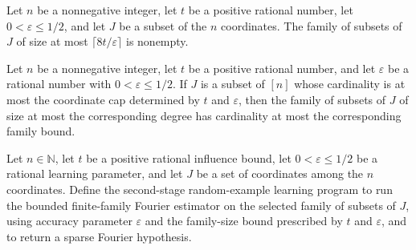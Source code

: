 \begin{theorem}
\label{FABL.monotoneSelectedFourierFamily_nonempty}
\leanok
{}
Let $n$ be a nonnegative integer, let $t$ be a positive rational number, let
$0<\varepsilon\le 1/2$, and let $J$ be a subset of the $n$ coordinates. The family of
subsets of $J$ of size at most $\lceil 8t/\varepsilon\rceil$ is nonempty.
\end{theorem}

\begin{theorem}
\label{FABL.card_monotoneSelectedFourierFamily_le}
\leanok
{}
Let $n$ be a nonnegative integer, let $t$ be a positive rational number, and let
$\varepsilon$ be a rational number with $0<\varepsilon\le 1/2$. If $J$ is a subset of
$[n]$ whose cardinality is at most the coordinate cap determined by $t$ and
$\varepsilon$, then the family of subsets of $J$ of size at most the corresponding
degree has cardinality at most the corresponding family bound.
\end{theorem}

\begin{definition}
\label{FABL.monotoneBoundedInfluenceSecondStage}
\leanok
{}
Let $n\in\mathbb{N}$, let $t$ be a positive rational influence bound, let
$0<\varepsilon\leq 1/2$ be a rational learning parameter, and let $J$ be a set of
coordinates among the $n$ coordinates. Define the second-stage random-example learning
program to run the bounded finite-family Fourier estimator on the selected family of
subsets of $J$, using accuracy parameter $\varepsilon$ and the family-size bound
prescribed by $t$ and $\varepsilon$, and to return a sparse Fourier hypothesis.
\end{definition}

